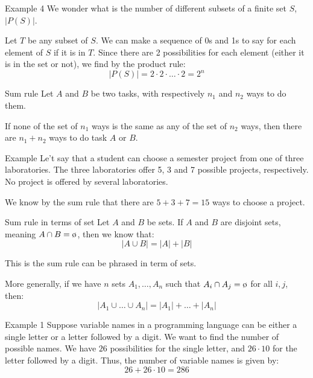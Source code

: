 \documentclass[a4paper]{article}
\begin{document}
\begin{parag}{Example 4}
    We wonder what is the number of different subsets of a finite set $S$, $\left|P\left(S\right)\right|$.

    Let $T$ be any subset of $S$. We can make a sequence of 0s and 1s to say for each element of $S$ if it is in $T$. Since there are 2 possibilities for each element (either it is in the set or not), we find by the product rule: 
    \[\left|P\left(S\right)\right| = 2\cdot 2\cdot \ldots \cdot 2 =  2^n\]
\end{parag}

\begin{parag}{Sum rule}
    Let $A$ and $B$ be two tasks, with respectively $n_1$ and $n_2$ ways to do them.

    If none of the set of $n_1$ ways is the same as any of the set of $n_2$ ways, then there are $n_1 + n_2$ ways to do task $A$ or $B$.
\end{parag}

\begin{parag}{Example}
    Le't say that a student can choose a semester project from one of three laboratories. The three laboratories offer 5, 3 and 7 possible projects, respectively. No project is offered by several laboratories. 

    We know by the sum rule that there are $5 + 3 + 7 = 15$ ways to choose a project.
\end{parag}

\begin{parag}{Sum rule in terms of set}
    Let $A$ and $B$ be sets. If $A$ and $B$ are disjoint sets, meaning $A \cap B = \o$, then we know that:    \[\left|A \cup B\right| = \left|A\right| + \left|B\right|\]

    This is the sum rule can be phrased in term of sets.

    More generally, if we have $n$ sets $A_1, \ldots, A_n$ such that $A_i \cap A_j = \o$ for all $i, j$, then: 
    \[\left|A_1 \cup \ldots \cup A_n\right| = \left|A_1\right| + \ldots + \left|A_n\right|\]
    
\end{parag}

\begin{parag}{Example 1}
    Suppose variable names in a programming language can be either a single letter or a letter followed by a digit. We want to find the number of possible names. We have $26$ possibilities for the single letter, and $26\cdot 10$ for the letter followed by a digit. Thus, the number of variable names is given by: 
    \[26 + 26\cdot 10 = 286\]
\end{parag}
\end{document}
